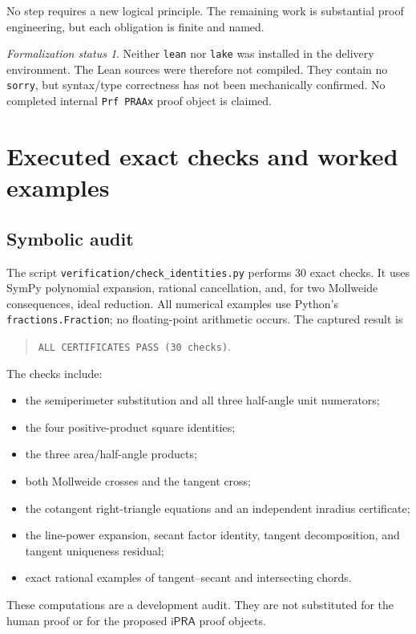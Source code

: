 \documentclass[11pt,letterpaper]{article}
\theoremstyle{definition}
\theoremstyle{remark}
\newtheorem{status}[theorem]{Formalization status}
\newcommand{\ipra}{\mathsf{iPRA}}
\newcommand{\code}[1]{\texttt{#1}}
\begin{document}
No step requires a new logical principle.  The remaining work is substantial
proof engineering, but each obligation is finite and named.

\begin{status}
Neither \code{lean} nor \code{lake} was installed in the delivery environment.
The Lean sources were therefore not compiled.  They contain no
\code{sorry}, but syntax/type correctness has not been mechanically confirmed.
No completed internal \code{Prf PRAAx} proof object is claimed.
\end{status}

\section{Executed exact checks and worked examples}
\label{sec:verification}

\subsection{Symbolic audit}

The script \code{verification/check\_identities.py} performs 30 exact checks.
It uses SymPy polynomial expansion, rational cancellation, and, for two
Mollweide consequences, ideal reduction.  All numerical examples use Python's
\code{fractions.Fraction}; no floating-point arithmetic occurs.  The captured
result is
\begin{quote}
\code{ALL CERTIFICATES PASS (30 checks)}.
\end{quote}
The checks include:
\begin{itemize}
\item the semiperimeter substitution and all three half-angle unit numerators;
\item the four positive-product square identities;
\item the three area/half-angle products;
\item both Mollweide crosses and the tangent cross;
\item the cotangent right-triangle equations and an independent inradius
certificate;
\item the line-power expansion, secant factor identity, tangent decomposition,
and tangent uniqueness residual;
\item exact rational examples of tangent--secant and intersecting chords.
\end{itemize}

These computations are a development audit.  They are not substituted for the
human proof or for the proposed \(\ipra\) proof objects.
\end{document}
